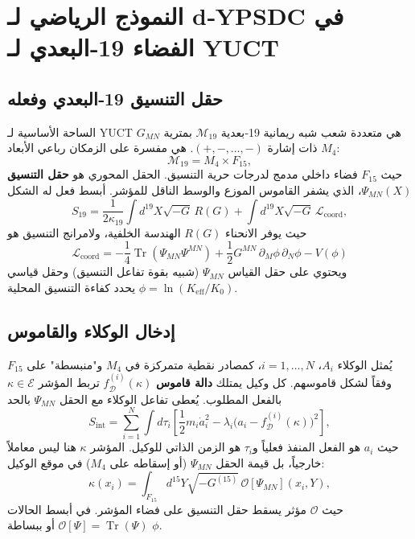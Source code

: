\documentclass[11pt,a4paper]{article}
\DeclareMathOperator{\Tr}{Tr}
\begin{document}
	\section{النموذج الرياضي لـ d‑YPSDC في الفضاء 19‑البعدي لـ YUCT}
	\label{sec:math-model}
	
	\subsection{حقل التنسيق 19‑البعدي وفعله}
	
	الساحة الأساسية لـ YUCT هي متعددة شعب شبه ريمانية 19‑بعدية \(\mathcal{M}_{19}\) بمترية \(G_{MN}\) ذات إشارة \((+,-,\dots,-)\). هي مفسرة على الزمكان رباعي الأبعاد \(M_4\):
	\begin{equation}
		\mathcal{M}_{19} = M_4 \times F_{15},
	\end{equation}
	حيث \(F_{15}\) فضاء داخلي مدمج لدرجات حرية التنسيق. الحقل المحوري هو \textbf{حقل التنسيق} \(\Psi_{MN}(X)\)، الذي يشفر القاموس الموزع والوسط الناقل للمؤشر. أبسط فعل له الشكل
	\begin{equation}
		S_{19} = \frac{1}{2\kappa_{19}} \int d^{19}X \sqrt{-G}\, R(G) + \int d^{19}X \sqrt{-G}\, \mathcal{L}_{\mathrm{coord}},
		\label{eq:S19}
	\end{equation}
	حيث يوفر الانحناء \(R(G)\) الهندسة الخلفية، ولامرانج التنسيق هو
	\begin{equation}
		\mathcal{L}_{\mathrm{coord}} = -\frac{1}{4} \Tr(\Psi_{MN}\Psi^{MN}) + \frac{1}{2} G^{MN}\,\partial_M \phi\,\partial_N \phi - V(\phi)
		\label{eq:Lcoord}
	\end{equation}
	ويحتوي على حقل القياس \(\Psi_{MN}\) (شبيه بقوة تفاعل التنسيق) وحقل قياسي \(\phi = \ln(K_{\mathrm{eff}}/K_0)\) يحدد كفاءة التنسيق المحلية.
	
	\subsection{إدخال الوكلاء والقاموس}
	
	يُمثل الوكلاء \(A_i\)، \(i=1,\dots,N\)، كمصادر نقطية متمركزة في \(M_4\) و"منبسطة" على \(F_{15}\) وفقاً لشكل قاموسهم. كل وكيل يمتلك \textbf{دالة قاموس} \(f_{\mathcal{D}}^{(i)}(\kappa)\) تربط المؤشر \(\kappa \in \mathcal{E}\) بالفعل المطلوب. يُعطى تفاعل الوكلاء مع الحقل \(\Psi_{MN}\) بالحد
	\begin{equation}
		S_{\mathrm{int}} = \sum_{i=1}^{N} \int d\tau_i \left[ \frac{1}{2} m_i \dot a_i^2 - \lambda_i \bigl( a_i - f_{\mathcal{D}}^{(i)}(\kappa) \bigr)^2 \right],
		\label{eq:Sint}
	\end{equation}
	حيث \(a_i\) هو الفعل المنفذ فعلياً و\(\tau_i\) هو الزمن الذاتي للوكيل. المؤشر \(\kappa\) هنا ليس معاملاً خارجياً، بل قيمة الحقل \(\Psi_{MN}\) (أو إسقاطه على \(M_4\)) في موقع الوكيل:
	\begin{equation}
		\kappa(x_i) = \int_{F_{15}} d^{15}Y \sqrt{-G^{(15)}}\, \mathcal{O}[\Psi_{MN}](x_i, Y),
		\label{eq:kappa}
	\end{equation}
	حيث \(\mathcal{O}\) مؤثر يسقط حقل التنسيق على فضاء المؤشر. في أبسط الحالات \(\mathcal{O}[\Psi] = \Tr(\Psi)\) أو ببساطة \(\phi\).
	
\end{document}
